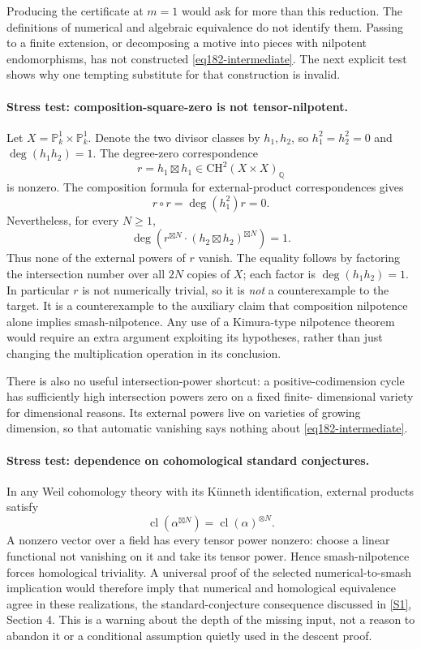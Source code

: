 \documentclass[11pt,a4paper]{article}
\newcommand{\Q}{\mathbb{Q}}
\newcommand{\PP}{\mathbb P}
\newcommand{\sref}[2]{\hyperlink{source:#1:#2}{[S#2]}}
\numberwithin{equation}{section}
\begin{document}
Producing the certificate at $m=1$ would ask for more than this reduction.
The definitions of numerical and algebraic equivalence do not identify
them. Passing to a finite extension, or decomposing a motive into pieces
with nilpotent endomorphisms, has not constructed
\eqref{eq182-intermediate}. The next explicit test shows why one tempting
substitute for that construction is invalid.

\paragraph{Stress test: composition-square-zero is not tensor-nilpotent.}
Let $X=\PP^1_k\times\PP^1_k$. Denote the two divisor classes by $h_1,h_2$,
so $h_1^2=h_2^2=0$ and $\deg(h_1h_2)=1$. The degree-zero correspondence
\[
                 r=h_1\boxtimes h_1
                         \in\mathrm{CH}^2(X\times X)_{\Q}
\]
is nonzero. The composition formula for external-product correspondences
gives
\[
                    r\circ r=\deg(h_1^2)r=0.
\]
Nevertheless, for every $N\ge1$,
\begin{equation}\label{eq182-notensor}
 \deg\left(r^{\boxtimes N}\cdot
                      (h_2\boxtimes h_2)^{\boxtimes N}\right)=1.
\end{equation}
Thus none of the external powers of $r$ vanish. The equality follows by
factoring the intersection number over all $2N$ copies of $X$; each factor
is $\deg(h_1h_2)=1$. In particular $r$ is not numerically trivial, so it is
\emph{not} a counterexample to the target. It is a counterexample to the
auxiliary claim that composition nilpotence alone implies smash-nilpotence.
Any use of a Kimura-type nilpotence theorem would require an extra argument
exploiting its hypotheses, rather than just changing the multiplication
operation in its conclusion.

There is also no useful intersection-power shortcut: a positive-codimension
cycle has sufficiently high intersection powers zero on a fixed finite-
dimensional variety for dimensional reasons. Its external powers live on
varieties of growing dimension, so that automatic vanishing says nothing
about \eqref{eq182-intermediate}.

\paragraph{Stress test: dependence on cohomological standard conjectures.}
In any Weil cohomology theory with its K\"unneth identification, external
products satisfy
\[
 \operatorname{cl}(\alpha^{\boxtimes N})
                      =\operatorname{cl}(\alpha)^{\otimes N}.
\]
A nonzero vector over a field has every tensor power nonzero: choose a
linear functional not vanishing on it and take its tensor power. Hence
smash-nilpotence forces homological triviality. A universal proof of the
selected numerical-to-smash implication would therefore imply that
numerical and homological equivalence agree in these realizations, the
standard-conjecture consequence discussed in \sref{182}{1}, Section 4.
This is a warning about the depth of the missing input, not a reason to
abandon it or a conditional assumption quietly used in the descent proof.
\end{document}

